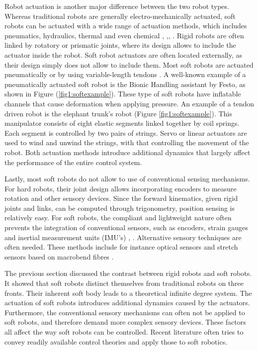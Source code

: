 Robot actuation is another major difference between the two robot types. Whereas traditional robots are generally electro-mechanically actuated, soft robots can be actuated with a wide range of actuation methods, which includes pneumatics, hydraulics, thermal and even chemical \cite{BHA}, \cite{marchese2014},\cite{kang2019programmable}, \cite{shepherd2013using}. Rigid robots are often linked by rotatory or prismatic joints, where its design allows to include the actuator inside the robot. Soft robot actuators are often located externally, as their design simply does not allow to include them. Most soft robots are actuated pneumatically or by using variable-length tendons \cite{Rus2015}. A well-known example of a pneumatically actuated soft robot is the Bionic Handling assistant by Festo, as shown in Figure (\ref{fig1:softexample}). These type of soft robots have inflatable channels that cause deformation when applying pressure. An example of a tendon driven robot is the elephant trunk's robot \cite{cieslak1999elephant} (Figure \ref{fig1:softexample}). This manipulator consists of eight elastic segments linked together by coil springs. Each segment is controlled by two pairs of strings. Servo or linear actuators are used to wind and unwind the strings, with that controlling the movement of the robot. Both actuation methods introduce additional dynamics that largely affect the performance of the entire control system. 

Lastly, most soft robots do not allow to use of conventional sensing mechanisms. For hard robots, their joint design allows incorporating encoders to measure rotation and other sensory devices. Since the forward kinematics, given rigid joints and links, can be computed through trigonometry, position sensing is relatively easy. For soft robots, the compliant and lightweight nature often prevents the integration of conventional sensors, such as encoders, strain gauges and inertial measurement units (IMU's) \cite{Rus2015}, \cite{Lee2017}. Alternative sensory techniques are often needed. These methods include for instance optical sensors and stretch sensors based on macrobend fibres \cite{Sareh2015}.


The previous section discussed the contrast between rigid robots and soft robots. It showed that soft robots distinct themselves from traditional robots on three fronts. Their inherent soft body leads to a theoretical infinite degree system. The actuation of soft robots introduces additional dynamics caused by the actuators. Furthermore, the conventional sensory mechanisms can often not be applied to soft robots, and therefore demand more complex sensory devices. These factors all affect the way soft robots can be controlled. Recent literature often tries to convey readily available control theories and apply those to soft robotics.

